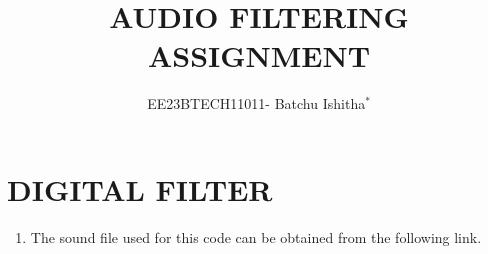 \documentclass[journal,12pt,twocolumn]{IEEEtran}
\theoremstyle{remark}
\begin{document}

\title{ AUDIO FILTERING ASSIGNMENT}
\author{EE23BTECH11011- Batchu Ishitha$^{*}$%
}
\maketitle

\bigskip

\renewcommand{\thefigure}{\theenumi}
\renewcommand{\thetable}{\theenumi}

\section{DIGITAL FILTER}
\begin{enumerate}[label=\thesection\arabic*.,ref=\thesection.\theenumi]
\item The sound file used for this code can be obtained from the following link.
\begin{lstlisting}

\end{lstlisting}


\end{enumerate}
\end{document}
